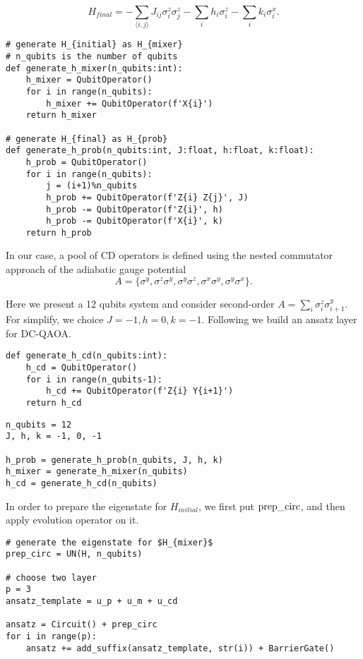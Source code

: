 \begin{equation}
    H_{final} = -\sum_{\langle i,j \rangle}J_{ij}\sigma_{i}^{z}\sigma_{j}^{z} - \sum_{i}h_{i}\sigma_{i}^{z} - \sum_{i}k_{i}\sigma_{i}^{x}.
\end{equation}
\begin{lstlisting}
# generate H_{initial} as H_{mixer}
# n_qubits is the number of qubits
def generate_h_mixer(n_qubits:int):
    h_mixer = QubitOperator()
    for i in range(n_qubits):
        h_mixer += QubitOperator(f'X{i}')
    return h_mixer

# generate H_{final} as H_{prob}
def generate_h_prob(n_qubits:int, J:float, h:float, k:float):
    h_prob = QubitOperator()
    for i in range(n_qubits):
        j = (i+1)%n_qubits
        h_prob += QubitOperator(f'Z{i} Z{j}', J)
        h_prob -= QubitOperator(f'Z{i}', h)
        h_prob -= QubitOperator(f'X{i}', k)
    return h_prob
\end{lstlisting}

In our case,  a pool of CD operators is defined using the nested commutator approach of the adiabatic gauge potential \cite{PhysRevResearch.4.013141}
$$A = \{\sigma^{y},\sigma^{z}\sigma^{y}, \sigma^{y}\sigma^{z}, \sigma^{x}\sigma^{y}, \sigma^{y}\sigma^{x} \}.$$

Here we present a 12 qubits system and consider second-order $A = \sum_{i}\sigma_{i}^{z}\sigma_{i+1}^{y}$. For simplify, we choice  $J = -1, h = 0, k = -1$. Following we build an ansatz layer for DC-QAOA.
\begin{lstlisting}
def generate_h_cd(n_qubits:int):
    h_cd = QubitOperator()
    for i in range(n_qubits-1):
        h_cd += QubitOperator(f'Z{i} Y{i+1}')
    return h_cd
\end{lstlisting}

\begin{lstlisting}
n_qubits = 12
J, h, k = -1, 0, -1

h_prob = generate_h_prob(n_qubits, J, h, k)
h_mixer = generate_h_mixer(n_qubits)
h_cd = generate_h_cd(n_qubits)
\end{lstlisting}

In order to prepare the eigenstate for $H_{initial}$, we first put ${\rm prep\_circ}$, and then apply evolution operator on it.
\begin{lstlisting}
# generate the eigenstate for $H_{mixer}$
prep_circ = UN(H, n_qubits)

# choose two layer
p = 3
ansatz_template = u_p + u_m + u_cd

ansatz = Circuit() + prep_circ
for i in range(p):
    ansatz += add_suffix(ansatz_template, str(i)) + BarrierGate()
\end{lstlisting}

